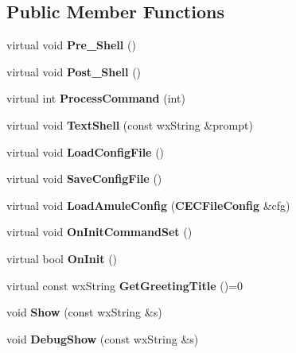 \subsection*{Public Member Functions}
\begin{DoxyCompactItemize}
\item 
virtual void {\bfseries Pre\_\-Shell} ()\label{classCaMuleExternalConnector_ac70e83afccf850c34037a12d232e1518}

\item 
virtual void {\bfseries Post\_\-Shell} ()\label{classCaMuleExternalConnector_a6d415e59f1ddc5d4f72ccf02926772cd}

\item 
virtual int {\bfseries ProcessCommand} (int)\label{classCaMuleExternalConnector_ac107d0829d9494443b430aa3e44ea4ac}

\item 
virtual void {\bfseries TextShell} (const wxString \&prompt)\label{classCaMuleExternalConnector_a2f4066daabbaa1ed05164bf9c814c4ad}

\item 
virtual void {\bfseries LoadConfigFile} ()\label{classCaMuleExternalConnector_a49402484bcf4abe88741098bf76a6190}

\item 
virtual void {\bfseries SaveConfigFile} ()\label{classCaMuleExternalConnector_aee1670de0f40a40da9328902b57e313c}

\item 
virtual void {\bfseries LoadAmuleConfig} ({\bf CECFileConfig} \&cfg)\label{classCaMuleExternalConnector_aedee1a3e9e6e142c76831183d0a0caae}

\item 
virtual void {\bfseries OnInitCommandSet} ()\label{classCaMuleExternalConnector_a3ef53b63beb6435ba6f66355f34364f6}

\item 
virtual bool {\bfseries OnInit} ()\label{classCaMuleExternalConnector_aa20c064df7eae088104d78a45b0e37c5}

\item 
virtual const wxString {\bfseries GetGreetingTitle} ()=0\label{classCaMuleExternalConnector_a1b75079c43e6a0e340c655eb582fa6b2}

\item 
void {\bfseries Show} (const wxString \&s)\label{classCaMuleExternalConnector_a68bc38bdae2909d540d5622f2e598305}

\item 
void {\bfseries DebugShow} (const wxString \&s)\label{classCaMuleExternalConnector_a58458f3db2bfa6bdec74e1bc4a1f9023}


\end{DoxyCompactItemize}
